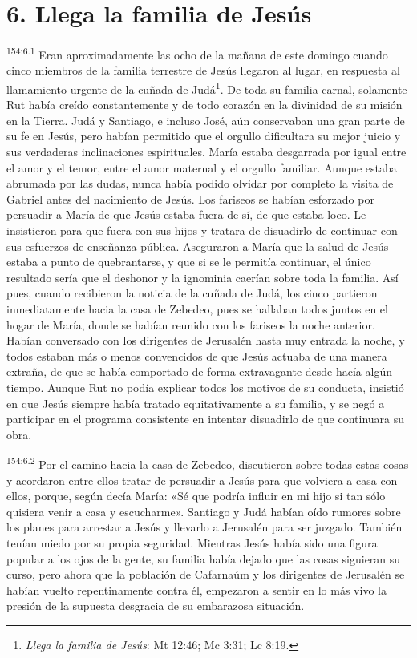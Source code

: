 \section*{6. Llega la familia de Jesús}
\par 
\textsuperscript{154:6.1} Eran aproximadamente las ocho de la mañana de este domingo cuando cinco miembros de la familia terrestre de Jesús llegaron al lugar, en respuesta al llamamiento urgente de la cuñada de Judá\footnote{\textit{Llega la familia de Jesús}: Mt 12:46; Mc 3:31; Lc 8:19.}. De toda su familia carnal, solamente Rut había creído constantemente y de todo corazón en la divinidad de su misión en la Tierra. Judá y Santiago, e incluso José, aún conservaban una gran parte de su fe en Jesús, pero habían permitido que el orgullo dificultara su mejor juicio y sus verdaderas inclinaciones espirituales. María estaba desgarrada por igual entre el amor y el temor, entre el amor maternal y el orgullo familiar. Aunque estaba abrumada por las dudas, nunca había podido olvidar por completo la visita de Gabriel antes del nacimiento de Jesús. Los fariseos se habían esforzado por persuadir a María de que Jesús estaba fuera de sí, de que estaba loco. Le insistieron para que fuera con sus hijos y tratara de disuadirlo de continuar con sus esfuerzos de enseñanza pública. Aseguraron a María que la salud de Jesús estaba a punto de quebrantarse, y que si se le permitía continuar, el único resultado sería que el deshonor y la ignominia caerían sobre toda la familia. Así pues, cuando recibieron la noticia de la cuñada de Judá, los cinco partieron inmediatamente hacia la casa de Zebedeo, pues se hallaban todos juntos en el hogar de María, donde se habían reunido con los fariseos la noche anterior. Habían conversado con los dirigentes de Jerusalén hasta muy entrada la noche, y todos estaban más o menos convencidos de que Jesús actuaba de una manera extraña, de que se había comportado de forma extravagante desde hacía algún tiempo. Aunque Rut no podía explicar todos los motivos de su conducta, insistió en que Jesús siempre había tratado equitativamente a su familia, y se negó a participar en el programa consistente en intentar disuadirlo de que continuara su obra.

\par 
\textsuperscript{154:6.2} Por el camino hacia la casa de Zebedeo, discutieron sobre todas estas cosas y acordaron entre ellos tratar de persuadir a Jesús para que volviera a casa con ellos, porque, según decía María: «Sé que podría influir en mi hijo si tan sólo quisiera venir a casa y escucharme». Santiago y Judá habían oído rumores sobre los planes para arrestar a Jesús y llevarlo a Jerusalén para ser juzgado. También tenían miedo por su propia seguridad. Mientras Jesús había sido una figura popular a los ojos de la gente, su familia había dejado que las cosas siguieran su curso, pero ahora que la población de Cafarnaúm y los dirigentes de Jerusalén se habían vuelto repentinamente contra él, empezaron a sentir en lo más vivo la presión de la supuesta desgracia de su embarazosa situación.

